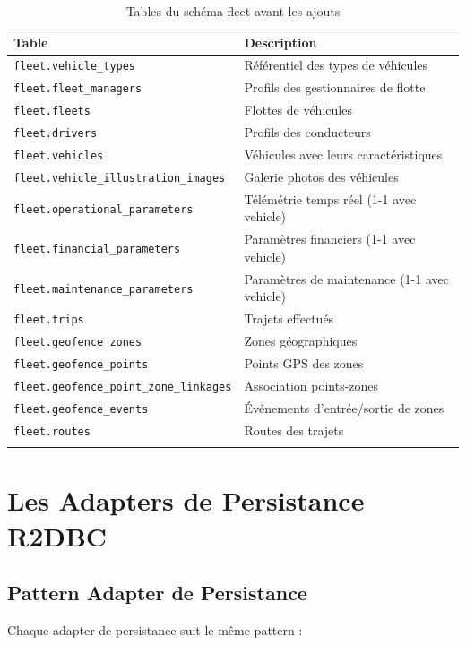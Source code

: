 \documentclass[12pt,a4paper]{report}
\begin{document}
\begin{longtable}{p{4.5cm}p{8.5cm}}
\toprule
\textbf{Table} & \textbf{Description} \\
\midrule
\endhead
\texttt{fleet.vehicle\_types} & Référentiel des types de véhicules \\
\texttt{fleet.fleet\_managers} & Profils des gestionnaires de flotte \\
\texttt{fleet.fleets} & Flottes de véhicules \\
\texttt{fleet.drivers} & Profils des conducteurs \\
\texttt{fleet.vehicles} & Véhicules avec leurs caractéristiques \\
\texttt{fleet.vehicle\_illustration\_images} & Galerie photos des véhicules \\
\texttt{fleet.operational\_parameters} & Télémétrie temps réel (1-1 avec vehicle) \\
\texttt{fleet.financial\_parameters} & Paramètres financiers (1-1 avec vehicle) \\
\texttt{fleet.maintenance\_parameters} & Paramètres de maintenance (1-1 avec vehicle) \\
\texttt{fleet.trips} & Trajets effectués \\
\texttt{fleet.geofence\_zones} & Zones géographiques \\
\texttt{fleet.geofence\_points} & Points GPS des zones \\
\texttt{fleet.geofence\_point\_zone\_linkages} & Association points-zones \\
\texttt{fleet.geofence\_events} & Événements d'entrée/sortie de zones \\
\texttt{fleet.routes} & Routes des trajets \\
\bottomrule
\caption{Tables du schéma fleet avant les ajouts}
\end{longtable}

\section{Les Adapters de Persistance R2DBC}

\subsection{Pattern Adapter de Persistance}

Chaque adapter de persistance suit le même pattern :
\end{document}
